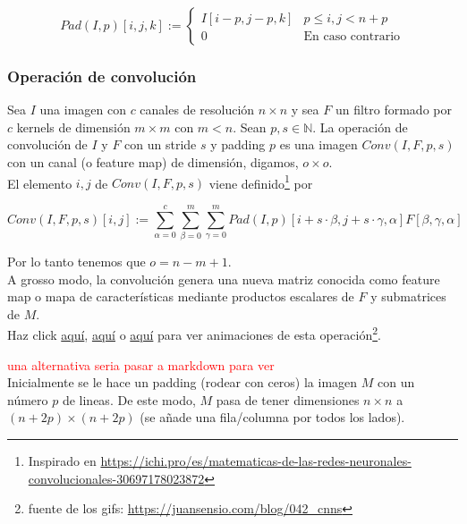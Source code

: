 \documentclass{article}
\begin{document}
$$Pad(I,p)[i,j,k]:=\begin{cases}
  I[i-p,j-p,k] & p\leq i,j<n+p\\
  0 & \text{En caso contrario}
\end{cases} $$


\subsubsection{Operación de convolución}
Sea $I$ una imagen con $c$ canales de resolución $n\times n$ y sea $F$ un filtro formado por $c$ kernels de dimensión $m\times m$ con $m<n$. Sean $p,s\in \mathbb{N}$. La operación de convolución de $I$ y $F$ con un stride $s$ y padding $p$ es una imagen $Conv(I,F,p,s)$ con un canal (o feature map) de dimensión, digamos, $o\times o$.\\


El elemento $i,j$ de $Conv(I,F,p,s)$ viene definido\footnote{Inspirado en \url{https://ichi.pro/es/matematicas-de-las-redes-neuronales-convolucionales-30697178023872}} por


$$Conv(I,F,p,s)[i,j]:=\sum_{\alpha=0}^c \sum_{\beta=0}^m \sum_{\gamma=0}^m Pad(I,p)[i+s\cdot\beta,j+s\cdot\gamma,\alpha] F[\beta,\gamma,\alpha]$$

Por lo tanto tenemos que  $o= n-m+1 $.\\
 
A grosso modo, la convolución genera una nueva matriz conocida como feature map o mapa de características mediante productos escalares de $F$ y submatrices de $M$.\\


Haz click \href{https://miro.medium.com/max/1052/1*GcI7G-JLAQiEoCON7xFbhg.gif}{aquí}, \href{https://cdn-media-1.freecodecamp.org/images/gb08-2i83P5wPzs3SL-vosNb6Iur5kb5ZH43}{aquí} o \href{https://thumbs.gfycat.com/AffectionateMemorableGreyhounddog-size_restricted.gif}{aquí} para ver animaciones de esta operación\footnote{fuente de los gifs: \url{https://juansensio.com/blog/042_cnns}}.

\textcolor{red}{una alternativa seria pasar a markdown para ver }\\

Inicialmente se le hace un padding (rodear con ceros) la imagen $M$ con un número $p$ de lineas. De este modo, $M$ pasa de tener dimensiones $n\times n$ a $(n+2p)\times (n+2p) $ (se añade una fila/columna por todos los lados).\\
\end{document}
